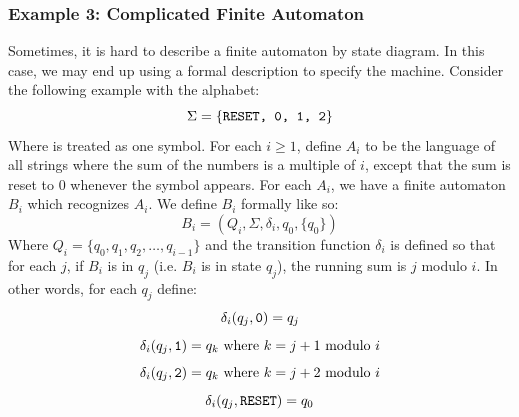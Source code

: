 \documentclass[letterpaper]{article}
\begin{document}
\subsubsection{Example 3: Complicated Finite Automaton}
Sometimes, it is hard to describe a finite automaton by state diagram. In this case, we may end up using a formal description to specify the machine. Consider the following example with the alphabet: 
\[\Sigma = \{\texttt{RESET, 0, 1, 2}\}\]
Where  is treated as one symbol. For each $i \geq 1$, define $A_i$ to be the language of all strings where the sum of the numbers is a multiple of $i$, except that the sum is reset to 0 whenever the symbol  appears. For each $A_i$, we have a finite automaton $B_i$ which recognizes $A_i$. We define $B_i$ formally like so: 
\[B_i = (Q_i, \Sigma, \delta_i, q_0, \{q_0\})\]
Where $Q_i = \{q_0, q_1, q_2, \dots, q_{i - 1}\}$ and the transition function $\delta_i$ is defined so that for each $j$, if $B_i$ is in $q_j$ (i.e. $B_i$ is in state $q_j$), the running sum is $j$ modulo $i$. In other words, for each $q_j$ define: 
\[\delta_{i}(q_j, \texttt{0}) = q_j\]
\[\delta_{i}(q_j, \texttt{1}) = q_k \text{  where } k = j + 1 \text{ modulo } i\]
\[\delta_{i}(q_j, \texttt{2}) = q_k \text{  where } k = j + 2 \text{ modulo } i\]
\[\delta_{i}(q_j, \texttt{RESET}) = q_0\]

\bigskip
\end{document}
